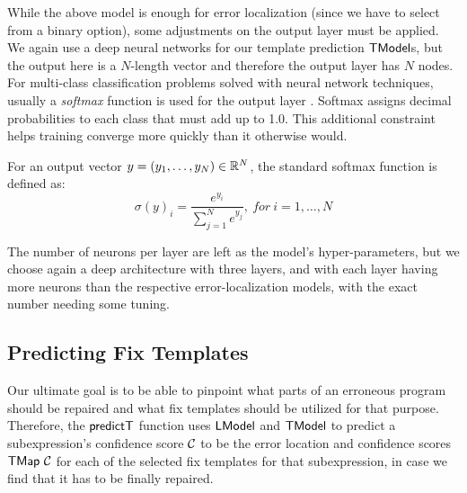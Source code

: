 While the above model is enough for error localization (since we have to select
from a binary option), some adjustments on the output layer must be applied. We
again use a deep neural networks for our template prediction $\mathsf{TModel}$s, but the
output here is a $N$-length vector and therefore the output layer has $N$ nodes.
For multi-class classification problems solved with neural network techniques,
usually a \emph{softmax} function is used for the output layer
\citep{Goodfellow-et-al-2016, Bishop-book-2006}. Softmax assigns decimal
probabilities to each class that must add up to 1.0. This additional constraint
helps training converge more quickly than it otherwise would.

For an output vector $y = (y_1, \dots, y_N) \in \mathbb{R}^{N}$, the standard softmax
function is defined as:
\[ \sigma(y)_i = \frac{e^{y_i}}{\sum_{j=1}^{N} e^{y_j}},\ for\ i = 1, \dots, N \]

The number of neurons per layer are left as the model's hyper-parameters, but we
choose again a deep architecture with three layers, and with each layer having
more neurons than the respective error-localization models, with the exact
number needing some tuning.



\subsection{Predicting Fix Templates}
\label{subsec:predict}

Our ultimate goal is to be able to pinpoint what parts of an erroneous program
should be repaired and what fix templates should be utilized for that purpose.
Therefore, the $\mathsf{predictT}$ function uses $\mathsf{LModel}$ and $\mathsf{TModel}$ to predict a
subexpression's confidence score $\mathcal{C}$ to be the error location and
confidence scores $\mathsf{TMap}\ \mathcal{C}$ for each of the selected fix templates for
that subexpression, in case we find that it has to be finally repaired.

